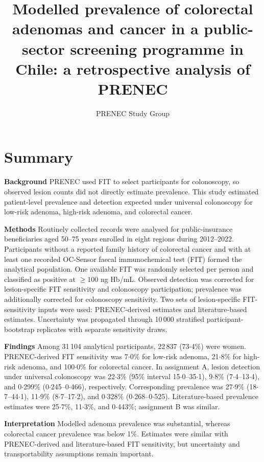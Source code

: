 \documentclass[10pt,a4paper]{article}
\title{\textbf{Modelled prevalence of colorectal adenomas and cancer in a public-sector screening programme in Chile: a retrospective analysis of PRENEC}}
\author{PRENEC Study Group}
\date{}
\newcommand{\dec}{\ensuremath{\cdot}}
\begin{document}
\maketitle

\section*{Summary}

\textbf{Background}\quad
PRENEC used FIT to select participants for colonoscopy, so observed lesion
counts did not directly estimate prevalence. This study estimated patient-level
prevalence and detection expected under universal colonoscopy for low-risk
adenoma, high-risk adenoma, and colorectal cancer.

\textbf{Methods}\quad
Routinely collected records were analysed for public-insurance beneficiaries
aged 50--75 years enrolled in eight regions during 2012--2022. Participants
without a reported family history of colorectal cancer and with at least one
recorded OC-Sensor faecal immunochemical test (FIT) formed the analytical
population. One available FIT was randomly selected per person and classified
as positive at $\geq100$ ng Hb/mL.
Observed detection was corrected for lesion-specific FIT sensitivity and
colonoscopy participation; prevalence was additionally corrected for
colonoscopy sensitivity. Two sets of lesion-specific FIT-sensitivity inputs
were used: PRENEC-derived estimates and literature-based estimates. Uncertainty
was propagated through 10\,000 stratified participant-bootstrap replicates
with separate sensitivity draws.

\textbf{Findings}\quad
Among 31\,104 analytical participants, 22\,837 (73\dec{}4\%) were women. PRENEC-derived
FIT sensitivity was 7\dec{}0\% for low-risk adenoma,
21\dec{}8\% for high-risk adenoma, and 100\dec{}0\% for colorectal cancer.
In assignment A, lesion detection under universal colonoscopy was 22\dec{}3\%
(95\% interval 15\dec{}0--35\dec{}1), 9\dec{}8\%
(7\dec{}4--13\dec{}4), and 0\dec{}299\% (0\dec{}245--0\dec{}466),
respectively. Corresponding prevalence was 27\dec{}9\%
(18\dec{}7--44\dec{}1), 11\dec{}9\% (8\dec{}7--17\dec{}2), and
0\dec{}328\% (0\dec{}268--0\dec{}525). Literature-based prevalence estimates
were 25\dec{}7\%, 11\dec{}3\%, and 0\dec{}443\%; assignment B was similar.

\textbf{Interpretation}\quad
Modelled adenoma prevalence was substantial, whereas colorectal cancer
prevalence was below 1\%. Estimates were similar with PRENEC-derived and
literature-based FIT sensitivity, but uncertainty and transportability
assumptions remain important.
\end{document}
